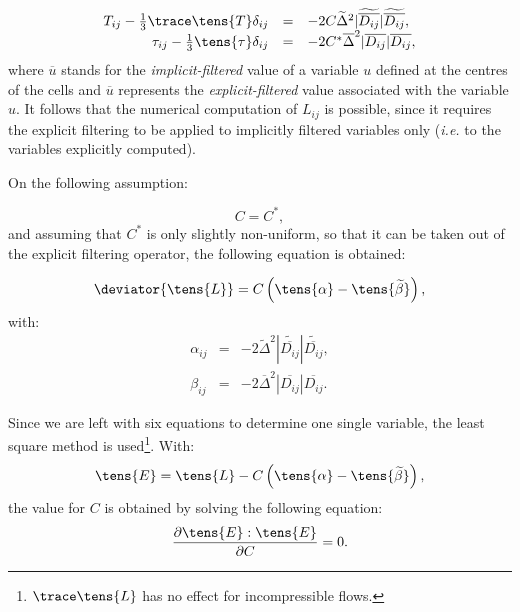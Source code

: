 \begin{equation}
\begin{array}{ r c l}
T_{ij}-\frac{1}{3}\trace \tens{T} \delta_{ij} &=& -2 C \widetilde{\Delta}^2 |\widetilde{%
\overline{D_{ij}}}| \widetilde{\overline{D_{ij}}}, \\
\tau_{ij}-\frac{1}{3} \tens{\tau } \delta_{ij} &=& -2 C^* \overline{\Delta}^2 |%
\overline{D_{ij}}| \overline{D_{ij}} ,
\end{array}
\end{equation}
where 
$\overline{u}$ stands for the \emph{implicit-filtered} value of a variable $u$
defined at the centres of the cells and $\overline{u}$ represents the
\emph{explicit-filtered} value associated with the variable $u$. It follows that
the numerical computation of $L_{ij}$ is possible, since it requires the
explicit filtering to be applied to implicitly filtered variables only 
(\emph{i.e.} to the variables explicitly computed).

On the following assumption:

\begin{equation}
C = C^*,
\end{equation}
and assuming that $C^*$ is only slightly non-uniform, so that it can be
taken out of the explicit filtering operator, the following equation is
obtained:

\begin{equation}
\deviator{\tens{L}} =  C \left(
\tens{ \alpha}- \tens{\widetilde{\beta}} \right),
\end{equation}
with:
\begin{equation}
\begin{array}{rcl}
\alpha_{ij} &=& -2 \widetilde{\Delta}^2 |\widetilde{\overline{D_{ij}}}|
\widetilde{\overline{D_{ij}}} , \\
\beta_{ij} &=& -2 \overline{\Delta}^2 |\overline{D_{ij}}| \overline{D_{ij}}.
\end{array}
\end{equation}

Since we are left with six equations to determine one single variable, the
least square method is used\footnote{
$\trace \tens{L}$ has no effect for
incompressible flows.}. With:
\begin{equation}
\tens{E} = \tens{L}-C \left( \tens{\alpha} - \tens{\widetilde{\beta}} \right),
\end{equation}
the value for $C$ is obtained by solving the following equation:
\begin{equation}
\frac{\partial \tens{E} : \tens{E}}{\partial C} = 0.
\end{equation}

